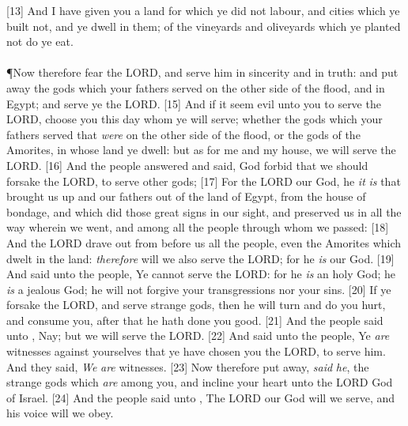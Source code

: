 [13] \textcolor[cmyk]{0.99998,1,0,0}{And I have given you a land for which ye did not labour, and cities which ye built not, and ye dwell in them; of the vineyards and oliveyards which ye planted not do ye eat.}\\
\\
\P \textcolor[cmyk]{0.99998,1,0,0}{Now therefore fear the LORD, and serve him in sincerity and in truth: and put away the gods which your fathers served on the other side of the flood, and in Egypt; and serve ye the LORD.}
[15] \textcolor[cmyk]{0.99998,1,0,0}{And if it seem evil unto you to serve the LORD, choose you this day whom ye will serve; whether the gods which your fathers served that \emph{were} on the other side of the flood, or the gods of the Amorites, in whose land ye dwell: but as for me and my house, we will serve the LORD.}
[16] \textcolor[cmyk]{0.99998,1,0,0}{And the people answered and said, God forbid that we should forsake the LORD, to serve other gods;}
[17] \textcolor[cmyk]{0.99998,1,0,0}{For the LORD our God, he \emph{it} \emph{is} that brought us up and our fathers out of the land of Egypt, from the house of bondage, and which did those great signs in our sight, and preserved us in all the way wherein we went, and among all the people through whom we passed:}
[18] \textcolor[cmyk]{0.99998,1,0,0}{And the LORD drave out from before us all the people, even the Amorites which dwelt in the land: \emph{therefore} will we also serve the LORD; for he \emph{is} our God.}
[19] \textcolor[cmyk]{0.99998,1,0,0}{And  said unto the people, Ye cannot serve the LORD: for he \emph{is} an holy God; he \emph{is} a jealous God; he will not forgive your transgressions nor your sins.}
[20] \textcolor[cmyk]{0.99998,1,0,0}{If ye forsake the LORD, and serve strange gods, then he will turn and do you hurt, and consume you, after that he hath done you good.}
[21] \textcolor[cmyk]{0.99998,1,0,0}{And the people said unto , Nay; but we will serve the LORD.}
[22] \textcolor[cmyk]{0.99998,1,0,0}{And  said unto the people, Ye \emph{are} witnesses against yourselves that ye have chosen you the LORD, to serve him. And they said, \emph{We} \emph{are} witnesses.}
[23] \textcolor[cmyk]{0.99998,1,0,0}{Now therefore put away, \emph{said} \emph{he}, the strange gods which \emph{are} among you, and incline your heart unto the LORD God of Israel.}
[24] \textcolor[cmyk]{0.99998,1,0,0}{And the people said unto , The LORD our God will we serve, and his voice will we obey.}
